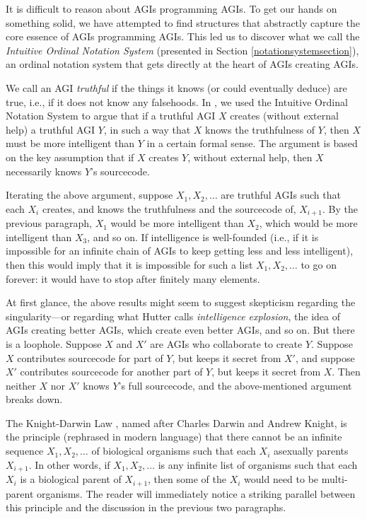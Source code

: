 \documentclass[runningheads]{llncs}
\begin{document}
It is difficult to reason about AGIs programming AGIs. To get our hands on something solid,
we have attempted to find structures that abstractly capture the core essence of
AGIs programming AGIs. This led us to discover
what we call the \emph{Intuitive Ordinal Notation System} (presented in Section
\ref{notationsystemsection}), an ordinal notation system that gets directly at
the heart of AGIs creating AGIs.

We call an AGI \emph{truthful} if the things it knows (or could eventually deduce) are true,
i.e., if it does not know any falsehoods.
In \cite{alexander2019measuring}, we used the Intuitive Ordinal Notation System to argue
that if a truthful AGI $X$ creates (without external help) a truthful AGI $Y$, in such a way
that $X$ knows the truthfulness of $Y$, then $X$ must be more intelligent than $Y$
in a certain formal sense. The argument is based on the key assumption that if $X$
creates $Y$, without external help, then $X$ necessarily knows $Y$'s sourcecode.

Iterating the above argument, suppose $X_1,X_2,\ldots$
are truthful AGIs such that each $X_i$ creates, and knows the truthfulness and
the sourcecode of, $X_{i+1}$. By the previous paragraph, $X_1$ would be more
intelligent than $X_2$, which would be more
intelligent than $X_3$, and so on. If intelligence is well-founded (i.e.,
if it is impossible for an infinite chain of AGIs to keep getting less and less intelligent),
then this would imply that it is impossible for such
a list $X_1,X_2,\ldots$ to go on forever: it would have to stop after finitely
many elements.

At first glance, the above results might
seem to suggest skepticism regarding the singularity---or regarding
what Hutter \cite{hutter2012} calls \emph{intelligence explosion}, the idea of
AGIs creating better AGIs, which create even better AGIs, and so on.
But there is a loophole. Suppose $X$ and $X'$ are AGIs
who collaborate to create $Y$. Suppose $X$ contributes sourcecode for
part of $Y$, but keeps it secret from $X'$, and suppose $X'$ contributes
sourcecode for another part of $Y$, but keeps it secret from $X$. Then neither
$X$ nor $X'$ knows $Y$'s full sourcecode, and the above-mentioned argument
breaks down.


The Knight-Darwin Law \cite{darwin1898knight}, named after Charles Darwin
and Andrew Knight, is the
principle (rephrased in modern language) that there cannot be an infinite
sequence $X_1,X_2,\ldots$ of biological organisms such that each $X_i$ asexually
parents $X_{i+1}$. In other words, if $X_1,X_2,\ldots$ is any infinite list of
organisms such that each $X_i$ is a biological parent of $X_{i+1}$, then some of the
$X_i$ would need to be multi-parent organisms.
The reader will immediately notice a striking parallel between
this principle and the discussion in the previous two paragraphs.
\end{document}
